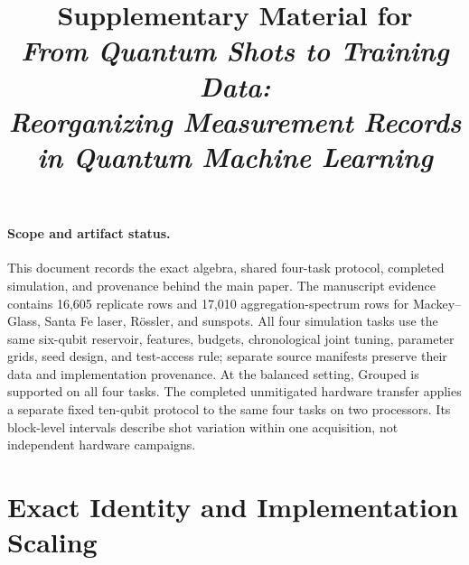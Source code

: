 \documentclass[10pt,conference]{IEEEtran}
\begin{document}
\title{Supplementary Material for\\
\emph{From Quantum Shots to Training Data:\\
Reorganizing Measurement Records in Quantum Machine Learning}}

\ifdefined\ANON
  \author{}
\else
  \author{%
  }
\fi

\maketitle
{}

\paragraph{Scope and artifact status.}
This document records the exact algebra, shared four-task protocol, completed
simulation, and provenance behind the main paper. The manuscript evidence
contains 16,605 replicate rows and 17,010 aggregation-spectrum rows for
Mackey--Glass, Santa Fe laser, R\"ossler, and sunspots. All four simulation
tasks use the same six-qubit reservoir, features, budgets, chronological joint
tuning, parameter grids, seed design, and test-access rule; separate source
manifests preserve their data and implementation provenance. At the balanced
setting, Grouped is supported on all four tasks. The completed unmitigated hardware transfer applies a separate
fixed ten-qubit protocol to the same four tasks on two processors. Its block-level
intervals describe shot variation within one acquisition, not independent
hardware campaigns.

\appendices

\section{Exact Identity and Implementation Scaling}
\label{app:identity}
\end{document}
